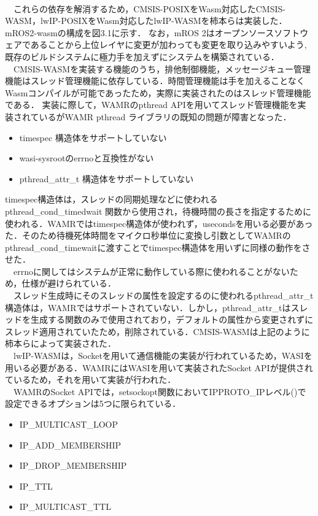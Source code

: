 \\　これらの依存を解消するため，CMSIS-POSIXをWasm対応したCMSIS-WASM，lwIP-POSIXをWasm対応したlwIP-WASMを柿本らは実装した．
mROS2-wasmの構成を図3.1に示す．
なお，mROS 2はオープンソースソフトウェアであることから上位レイヤに変更が加わっても変更を取り込みやすいよう,既存のビルドシステムに極力手を加えずにシステムを構築されている．
\\　CMSIS-WASMを実装する機能のうち，排他制御機能，メッセージキュー管理機能はスレッド管理機能に依存している．時間管理機能は手を加えることなくWasmコンパイルが可能であったため，実際に実装されたのはスレッド管理機能である．
実装に際して，WAMRのpthread APIを用いてスレッド管理機能を実装されているがWAMR pthread ライブラリの既知の問題が障害となった．
\begin{itemize}
    \item timespec 構造体をサポートしていない
    \item wasi-sysrootのerrnoと互換性がない
    \item pthread\_attr\_t 構造体をサポートしていない
\end{itemize}
timespec構造体は，スレッドの同期処理などに使われるpthread\_cond\_timedwait 関数から使用され，待機時間の長さを指定するために使われる．WAMRではtimespec構造体が使われず，usecondsを用いる必要があった．そのため待機死体時間をマイクロ秒単位に変換し引数としてWAMRのpthread\_cond\_timewaitに渡すことでtimespec構造体を用いずに同様の動作をさせた．
\\　errnoに関してはシステムが正常に動作している際に使われることがないため，仕様が避けられている．
\\　スレッド生成時にそのスレッドの属性を設定するのに使われるpthread\_attr\_t構造体は，WAMRではサポートされていない．しかし，pthread\_attr\_tはスレッドを生成する関数のみで使用されており，デフォルトの属性から変更されずにスレッド適用されていたため，削除されている．CMSIS-WASMは上記のように柿本らによって実装された．
\\　lwIP-WASMは，Socketを用いて通信機能の実装が行われているため，WASIを用いる必要がある．WAMRにはWASIを用いて実装されたSocket APIが提供されているため，それを用いて実装が行われた．
\\　WAMRのSocket APIでは，setsockopt関数においてIPPROTO\_IPレベル()で設定できるオプションは5つに限られている．
\begin{itemize}
    \item IP\_MULTICAST\_LOOP
    \item IP\_ADD\_MEMBERSHIP
    \item IP\_DROP\_MEMBERSHIP
    \item IP\_TTL
    \item IP\_MULTICAST\_TTL
\end{itemize}
